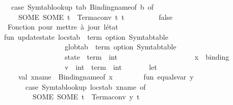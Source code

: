 \begin{isabellebody}
\ \ \ \ \ \ case\ Symtab{\isachardot}{\kern0pt}lookup\ tab\ {\isacharparenleft}{\kern0pt}Binding{\isachardot}{\kern0pt}name{\isacharunderscore}{\kern0pt}of\ b{\isacharparenright}{\kern0pt}\ of\isanewline
\ \ \ \ \ \ \ \ SOME\ {\isacharparenleft}{\kern0pt}SOME\ t{\isacharprime}{\kern0pt}{\isacharparenright}{\kern0pt}\ {\isacharequal}{\kern0pt}{\isachargreater}{\kern0pt}\ Term{\isachardot}{\kern0pt}aconv\ {\isacharparenleft}{\kern0pt}t{\isacharcomma}{\kern0pt}\ t{\isacharprime}{\kern0pt}{\isacharparenright}{\kern0pt}\isanewline
\ \ \ \ \ \ {\isacharbar}{\kern0pt}\ {\isacharunderscore}{\kern0pt}\ {\isacharequal}{\kern0pt}{\isachargreater}{\kern0pt}\ false\isanewline
\isanewline
\ \ \ \ {\isacharparenleft}{\kern0pt}{\isacharasterisk}{\kern0pt}\ Fonction\ pour\ mettre\ à\ jour\ l{\isacharprime}{\kern0pt}état\ {\isacharasterisk}{\kern0pt}{\isacharparenright}{\kern0pt}\isanewline
\ \ \ \ fun\ update{\isacharunderscore}{\kern0pt}state\ {\isacharparenleft}{\kern0pt}locstab\ {\isacharcolon}{\kern0pt}\ {\isacharparenleft}{\kern0pt}term\ option{\isacharparenright}{\kern0pt}\ Symtab{\isachardot}{\kern0pt}table{\isacharparenright}{\kern0pt}\isanewline
\ \ \ \ \ \ \ \ \ \ \ \ \ \ \ \ \ \ \ \ \ {\isacharparenleft}{\kern0pt}globtab\ {\isacharcolon}{\kern0pt}\ {\isacharparenleft}{\kern0pt}term\ option{\isacharparenright}{\kern0pt}\ Symtab{\isachardot}{\kern0pt}table{\isacharparenright}{\kern0pt}\isanewline
\ \ \ \ \ \ \ \ \ \ \ \ \ \ \ \ \ \ \ \ \ {\isacharparenleft}{\kern0pt}state\ {\isacharcolon}{\kern0pt}\ term\ {\isacharminus}{\kern0pt}{\isachargreater}{\kern0pt}\ int{\isacharparenright}{\kern0pt}\isanewline
\ \ \ \ \ \ \ \ \ \ \ \ \ \ \ \ \ \ \ \ \ {\isacharparenleft}{\kern0pt}x\ {\isacharcolon}{\kern0pt}\ binding{\isacharparenright}{\kern0pt}\isanewline
\ \ \ \ \ \ \ \ \ \ \ \ \ \ \ \ \ \ \ \ \ {\isacharparenleft}{\kern0pt}v\ {\isacharcolon}{\kern0pt}\ int{\isacharparenright}{\kern0pt}\ {\isacharcolon}{\kern0pt}\ term\ {\isacharminus}{\kern0pt}{\isachargreater}{\kern0pt}\ int\ {\isacharequal}{\kern0pt}\isanewline
\ \ \ \ \ \ let\isanewline
\ \ \ \ \ \ \ \ val\ x{\isacharunderscore}{\kern0pt}name\ {\isacharequal}{\kern0pt}\ Binding{\isachardot}{\kern0pt}name{\isacharunderscore}{\kern0pt}of\ x\isanewline
\ \ \ \ \ \ \ \ fun\ equals{\isacharunderscore}{\kern0pt}var\ y\ {\isacharequal}{\kern0pt}\isanewline
\ \ \ \ \ \ \ \ \ \ case\ Symtab{\isachardot}{\kern0pt}lookup\ locstab\ x{\isacharunderscore}{\kern0pt}name\ of\isanewline
\ \ \ \ \ \ \ \ \ \ \ \ SOME\ {\isacharparenleft}{\kern0pt}SOME\ t{\isacharprime}{\kern0pt}{\isacharparenright}{\kern0pt}\ {\isacharequal}{\kern0pt}{\isachargreater}{\kern0pt}\ Term{\isachardot}{\kern0pt}aconv\ {\isacharparenleft}{\kern0pt}y{\isacharcomma}{\kern0pt}\ t{\isacharprime}{\kern0pt}{\isacharparenright}{\kern0pt}\isanewline

\end{isabellebody}
